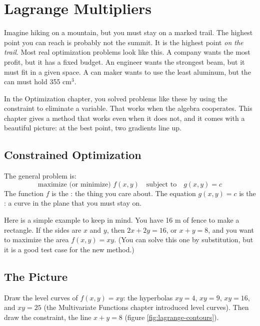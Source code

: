 \chapter{Lagrange Multipliers}

Imagine hiking on a mountain, but you must stay on a marked trail. The highest
point you can reach is probably not the summit. It is the highest point
\emph{on the trail}. Most real optimization problems look like this. A company
wants the most profit, but it has a fixed budget. An engineer wants the strongest
beam, but it must fit in a given space. A can maker wants to use the least
aluminum, but the can must hold 355 cm$^3$.

In the Optimization chapter, you solved problems like these by using the
constraint to eliminate a variable. That works when the algebra cooperates.
This chapter gives a method that works even when it does not, and it comes with
a beautiful picture: at the best point, two gradients line up.

\section{Constrained Optimization}
The general problem is:
$$\text{maximize (or minimize) } f(x, y) \quad \text{subject to} \quad g(x, y) = c$$
The function $f$ is the : the thing you care about. The equation
$g(x, y) = c$ is the : a curve in the plane that you must stay on.

Here is a simple example to keep in mind. You have 16 m of fence to make a
rectangle. If the sides are $x$ and $y$, then $2x + 2y = 16$, or $x + y = 8$, and you
want to maximize the area $f(x, y) = xy$. (You can solve this one by substitution,
but it is a good test case for the new method.)

\section{The Picture}
Draw the level curves of $f(x, y) = xy$: the hyperbolas $xy = 4$, $xy = 9$, $xy = 16$,
and $xy = 25$ (the Multivariate Functions chapter introduced level curves). Then
draw the constraint, the line $x + y = 8$ (figure \ref{fig:lagrange-contours}).

